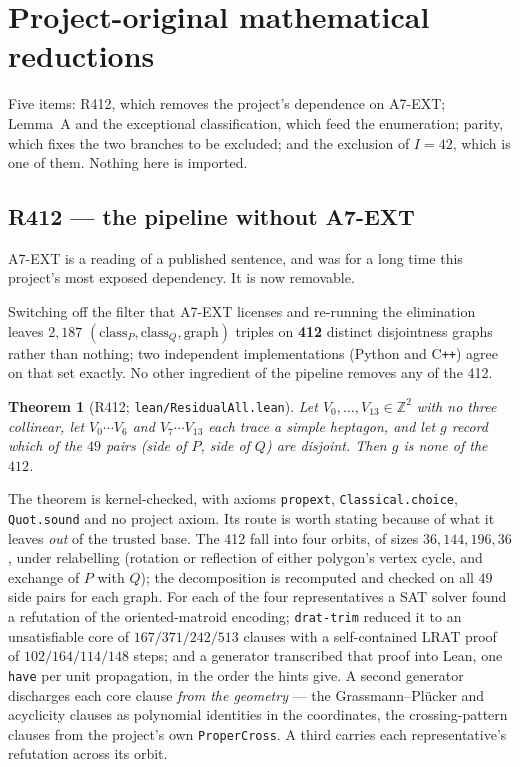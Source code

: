 \documentclass[11pt,a4paper]{article}
\theoremstyle{plain}
\newtheorem{theorem}{Theorem}
\theoremstyle{definition}
\theoremstyle{remark}
\begin{document}
\section{Project-original mathematical reductions}

Five items: \textsf{R412}, which removes the project's dependence on
\textsf{A7-EXT}; Lemma~A and the exceptional classification, which feed the
enumeration; parity, which fixes the two branches to be excluded; and the
exclusion of $I=42$, which is one of them. Nothing here is imported.

\subsection{\texorpdfstring{\textsf{R412} --- the pipeline without \textsf{A7-EXT}}{R412 -- the pipeline without A7-EXT}}\label{sec:r412}

\textsf{A7-EXT} is a reading of a published sentence, and was for a long time
this project's most exposed dependency. It is now removable.

Switching off the filter that \textsf{A7-EXT} licenses and re-running the
elimination leaves $2{,}187$ $(\text{class}_P,\text{class}_Q,\text{graph})$
triples on \textbf{412} distinct disjointness graphs rather than nothing; two
independent implementations (Python and C\texttt{++}) agree on that set exactly.
No other ingredient of the pipeline removes any of the 412.

\begin{theorem}[\textsf{R412}; \texttt{lean/ResidualAll.lean}]\label{thm:r412}
Let $V_0,\dots,V_{13}\in\mathbb{Z}^2$ with no three collinear, let
$V_0\cdots V_6$ and $V_7\cdots V_{13}$ each trace a simple heptagon, and let
$g$ record which of the $49$ pairs (side of $P$, side of $Q$) are disjoint.
Then $g$ is none of the $412$.
\end{theorem}

The theorem is kernel-checked, with axioms \texttt{propext},
\texttt{Classical.choice}, \texttt{Quot.sound} and no project axiom. Its route
is worth stating because of what it leaves \emph{out} of the trusted base. The
412 fall into four orbits, of sizes $36,144,196,36$, under relabelling
(rotation or reflection of either polygon's vertex cycle, and exchange of $P$
with $Q$); the decomposition is recomputed and checked on all $49$ side pairs
for each graph. For each of the four representatives a SAT solver found a
refutation of the oriented-matroid encoding; \texttt{drat-trim} reduced it to an
unsatisfiable core of $167/371/242/513$ clauses with a self-contained LRAT proof
of $102/164/114/148$ steps; and a generator transcribed that proof into Lean,
one \texttt{have} per unit propagation, in the order the hints give. A second
generator discharges each core clause \emph{from the geometry} --- the
Grassmann--Pl\"ucker and acyclicity clauses as polynomial identities in the
coordinates, the crossing-pattern clauses from the project's own
\texttt{ProperCross}. A third carries each representative's refutation across
its orbit.
\end{document}
